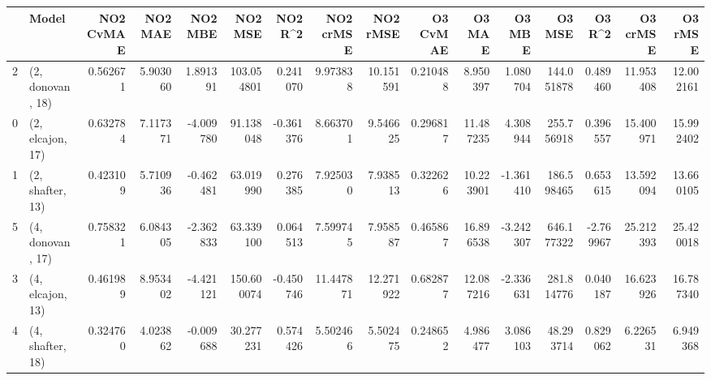 \begin{tabular}{llrrrrrrrrrrrrrr}
\toprule
{} &             Model &  NO2 CvMAE &   NO2 MAE &   NO2 MBE &     NO2 MSE &   NO2 R\textasciicircum2 &  NO2 crMSE &   NO2 rMSE &  O3 CvMAE &     O3 MAE &    O3 MBE &      O3 MSE &    O3 R\textasciicircum2 &   O3 crMSE &    O3 rMSE \\
\midrule
2 &  (2, donovan, 18) &   0.562671 &  5.903060 &  1.891391 &  103.054801 &  0.241070 &   9.973838 &  10.151591 &  0.210488 &   8.950397 &  1.080704 &  144.051878 &  0.489460 &  11.953408 &  12.002161 \\
0 &  (2, elcajon, 17) &   0.632784 &  7.117371 & -4.009780 &   91.138048 & -0.361376 &   8.663701 &   9.546625 &  0.296817 &  11.487235 &  4.308944 &  255.756918 &  0.396557 &  15.400971 &  15.992402 \\
1 &  (2, shafter, 13) &   0.423109 &  5.710936 & -0.462481 &   63.019990 &  0.276385 &   7.925030 &   7.938513 &  0.322626 &  10.223901 & -1.361410 &  186.598465 &  0.653615 &  13.592094 &  13.660105 \\
5 &  (4, donovan, 17) &   0.758321 &  6.084305 & -2.362833 &   63.339100 &  0.064513 &   7.599745 &   7.958587 &  0.465867 &  16.896538 & -3.242307 &  646.177322 & -2.769967 &  25.212393 &  25.420018 \\
3 &  (4, elcajon, 13) &   0.461989 &  8.953402 & -4.421121 &  150.600074 & -0.450746 &  11.447871 &  12.271922 &  0.682877 &  12.087216 & -2.336631 &  281.814776 &  0.040187 &  16.623926 &  16.787340 \\
4 &  (4, shafter, 18) &   0.324760 &  4.023862 & -0.009688 &   30.277231 &  0.574426 &   5.502466 &   5.502475 &  0.248652 &   4.986477 &  3.086103 &   48.293714 &  0.829062 &   6.226531 &   6.949368 \\
\bottomrule
\end{tabular}
